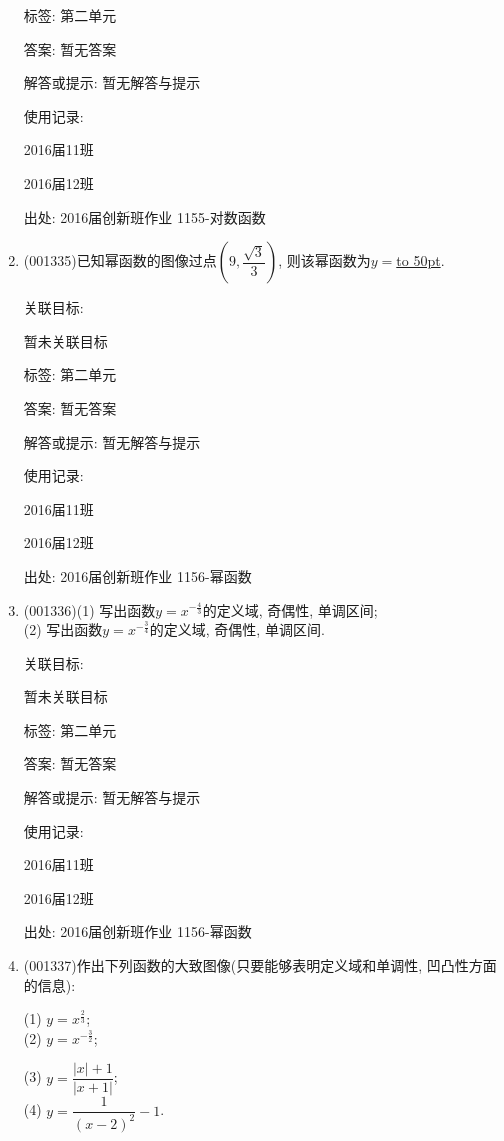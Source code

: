 \documentclass[10pt,a4paper]{article}
\newcommand{\blank}[1]{\underline{\hbox to #1pt{}}}
\begin{document}
\begin{enumerate}[1.]
标签: 第二单元

答案: 暂无答案

解答或提示: 暂无解答与提示

使用记录:

2016届11班	

2016届12班	


出处: 2016届创新班作业	1155-对数函数
\item { (001335)}已知幂函数的图像过点$(9,\dfrac{\sqrt{3}}{3})$, 则该幂函数为$y=$\blank{50}.


关联目标:

暂未关联目标



标签: 第二单元

答案: 暂无答案

解答或提示: 暂无解答与提示

使用记录:

2016届11班	

2016届12班	


出处: 2016届创新班作业	1156-幂函数
\item { (001336)}(1) 写出函数$y=x^{-\frac{4}{3}}$的定义域, 奇偶性, 单调区间;\\ 
(2) 写出函数$y=x^{-\frac{3}{4}}$的定义域, 奇偶性, 单调区间.


关联目标:

暂未关联目标



标签: 第二单元

答案: 暂无答案

解答或提示: 暂无解答与提示

使用记录:

2016届11班		

2016届12班		


出处: 2016届创新班作业	1156-幂函数
\item { (001337)}作出下列函数的大致图像(只要能够表明定义域和单调性, 凹凸性方面的信息):\\ 
\begin{multicols}{2}
(1) $y=x^{\frac{2}{3}}$; \\ 
(2) $y=x^{-\frac{3}{2}}$; \\ 
\end{multicols}
\begin{multicols}{2}
(3) $y=\dfrac{|x|+1}{|x+1|}$;  \\ 
(4) $y=\dfrac{1}{(x-2)^2}-1$.
\end{multicols}



\end{enumerate}
\end{document}
